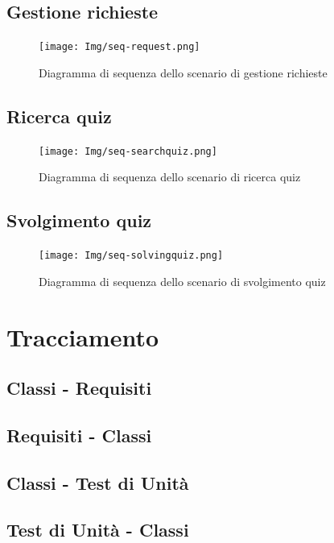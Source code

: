 \documentclass[a4paper, titlepage]{article}
\begin{document}
	
	\subsection{Gestione richieste}
	\begin{figure}[!h]
		\centering
		\texttt{[image: Img/seq-request.png]}
		\caption{Diagramma di sequenza dello scenario di gestione richieste}
	\end{figure}
	
	\subsection{Ricerca quiz}
	\begin{figure}[!h]
		\centering
		\texttt{[image: Img/seq-searchquiz.png]}
		\caption{Diagramma di sequenza dello scenario di ricerca quiz}
	\end{figure}
	
	\subsection{Svolgimento quiz}
	\begin{figure}[!h]
		\centering
		\texttt{[image: Img/seq-solvingquiz.png]}
		\caption{Diagramma di sequenza dello scenario di svolgimento quiz}
	\end{figure}

\newpage
\appendix
\section{Tracciamento}

\subsection{Classi - Requisiti}


\subsection{Requisiti - Classi}


\subsection{Classi - Test di Unità}


\subsection{Test di Unità - Classi}

\end{document}
